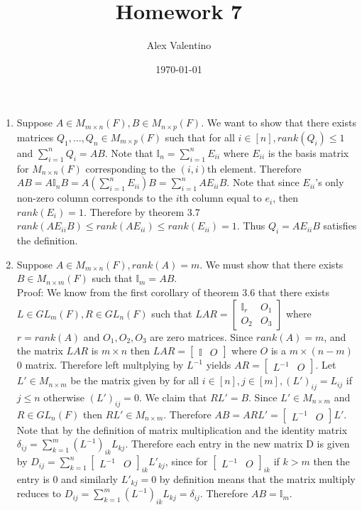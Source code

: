\documentclass[12pt, letterpaper]{article}
\date{\today}
\author{Alex Valentino}
\title{Homework 7}
\begin{document}
\begin{enumerate}
	\item Suppose $A \in M_{m \times n}(F), B \in M_{n \times p}(F)$.  We want to show that there exists matrices $Q_1,\ldots,Q_n \in M_{m \times p}(F)$ such that for all $i \in [n], rank(Q_i) \leq 1$ and $\sum_{i=1}^n Q_i = AB$.  Note that $\mathbb{I}_n = \sum_{i=1}^n E_{ii}$ where $E_{ii}$ is the basis matrix for $M_{n\times n}(F)$ corresponding to the $(i,i)$th element.  Therefore $AB = A \mathbb{I}_n B = A(\sum_{i=1}^n E_{ii})B = \sum_{i=1}^n A E_{ii} B$.  Note that since $E_{ii}$'s only non-zero column corresponds to the $i$th column equal to $e_i$, then $rank(E_i) = 1$.  Therefore by theorem 3.7 $rank(A E_{ii} B) \leq rank(A E_{ii}) \leq rank(E_{ii}) = 1$.  Thus $Q_i = A E_{ii} B$ satisfies the definition.    
	\newpage
	 \item Suppose $A \in M_{m \times n} (F), rank(A) = m$.  We must show that there exists $B \in M_{n \times m} (F)$ such that $\mathbb{I}_m = AB$.\\
	 Proof: We know from the first corollary of theorem 3.6 that there exists $L \in GL_m (F), R \in GL_n (F)$ such that $L A R = 
	 \begin{bmatrix} \mathbb{I}_r & O_1 \\ O_2 & O_3\end{bmatrix}$ where $r = rank(A)$ and $O_1,O_2,O_3$ are zero matrices.  Since $rank(A) = m$, and the matrix $LAR$ is $m \times n$ then $LAR = \left[ \begin{array}{c|c} \mathbb{I} & O \end{array} \right]$ where $O$ is a $m \times (n-m)$ 0 matrix. 
Therefore left multplying by $L^{-1}$ yields $AR = \left[ \begin{array}{c|c} L^{-1} & O \end{array} \right]$. 
Let $L' \in M_{n \times m}$ be the matrix given by for all $i \in [n], j \in [m], (L')_{ij} = L_{ij}$ if $j \leq n$ otherwise $(L')_{ij} = 0$.  We claim that $RL' = B$.  Since $L' \in M_{n \times m}$ and $R \in GL_n (F)$ then $RL' \in M_{n \times m}$.  Therefore $AB = ARL' =\left[ \begin{array}{c|c} L^{-1} & O \end{array} \right] L'$.  Note that by the definition of matrix multiplication and the identity matrix $\delta_{ij} = \sum_{k = 1}^m (L^{-1})_{ik} L_{kj}$.  Therefore each entry in the new matrix D is given by $ D_{ij} = \sum_{k = 1}^n \left[ \begin{array}{c|c} L^{-1} & O \end{array} \right]_{ik} L'_{kj}$, since for $\left[ \begin{array}{c|c} L^{-1} & O \end{array} \right]_{ik}$ if $k > m$ then the entry is 0 and similarly $L'_{kj} = 0$ by definition means that the matrix multiply reduces to $ D_{ij} = \sum_{k = 1}^m (L^{-1})_{ik} L_{kj} = \delta_{ij}$.  Therefore $AB = \mathbb{I}_m$.

\end{enumerate}
\end{document}
